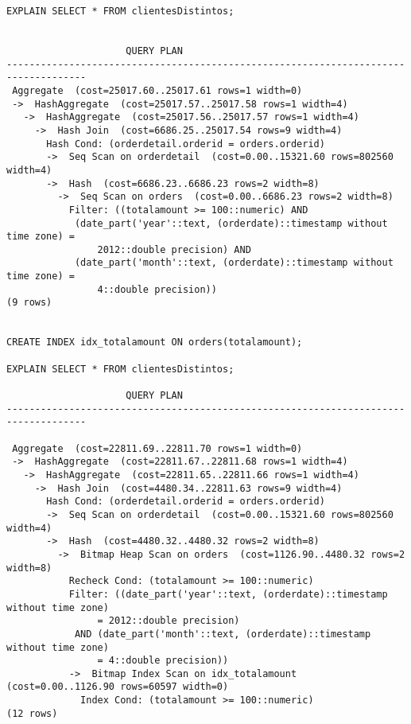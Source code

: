 \documentclass{article}
\begin{document}
\begin{Verbatim}
EXPLAIN SELECT * FROM clientesDistintos;


				     QUERY PLAN                                                                                                                                
------------------------------------------------------------------------------------
 Aggregate  (cost=25017.60..25017.61 rows=1 width=0)
 ->  HashAggregate  (cost=25017.57..25017.58 rows=1 width=4)
   ->  HashAggregate  (cost=25017.56..25017.57 rows=1 width=4)
     ->  Hash Join  (cost=6686.25..25017.54 rows=9 width=4)
       Hash Cond: (orderdetail.orderid = orders.orderid)
       ->  Seq Scan on orderdetail  (cost=0.00..15321.60 rows=802560 width=4)
       ->  Hash  (cost=6686.23..6686.23 rows=2 width=8)
         ->  Seq Scan on orders  (cost=0.00..6686.23 rows=2 width=8)
           Filter: ((totalamount >= 100::numeric) AND
           	(date_part('year'::text, (orderdate)::timestamp without time zone) =
           		2012::double precision) AND 
           	(date_part('month'::text, (orderdate)::timestamp without time zone) =
           		4::double precision))
(9 rows)


CREATE INDEX idx_totalamount ON orders(totalamount);

EXPLAIN SELECT * FROM clientesDistintos;

    				 QUERY PLAN                                                                                                                                
------------------------------------------------------------------------------------

 Aggregate  (cost=22811.69..22811.70 rows=1 width=0)
 ->  HashAggregate  (cost=22811.67..22811.68 rows=1 width=4)
   ->  HashAggregate  (cost=22811.65..22811.66 rows=1 width=4)
     ->  Hash Join  (cost=4480.34..22811.63 rows=9 width=4)
       Hash Cond: (orderdetail.orderid = orders.orderid)
       ->  Seq Scan on orderdetail  (cost=0.00..15321.60 rows=802560 width=4)
       ->  Hash  (cost=4480.32..4480.32 rows=2 width=8)
         ->  Bitmap Heap Scan on orders  (cost=1126.90..4480.32 rows=2 width=8)
           Recheck Cond: (totalamount >= 100::numeric)
           Filter: ((date_part('year'::text, (orderdate)::timestamp without time zone)
           		= 2012::double precision)
           	AND (date_part('month'::text, (orderdate)::timestamp without time zone) 
           		= 4::double precision))
           ->  Bitmap Index Scan on idx_totalamount  (cost=0.00..1126.90 rows=60597 width=0)
             Index Cond: (totalamount >= 100::numeric)
(12 rows)



\end{Verbatim}
\end{document}

